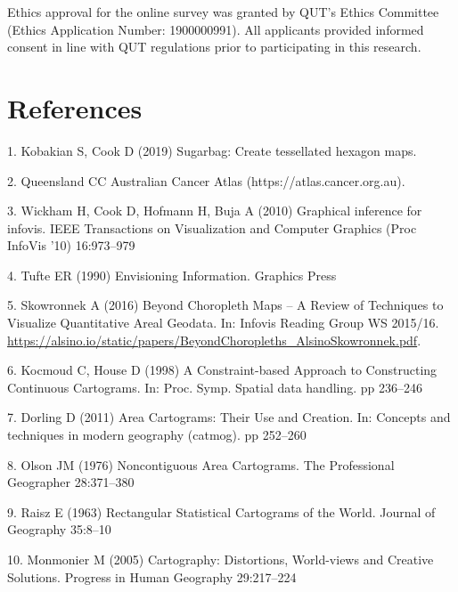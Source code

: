 \documentclass[conference,final,]{IEEEtran}
\begin{document}
Ethics approval for the online survey was granted by QUT's Ethics Committee (Ethics Application Number: 1900000991). All applicants provided informed consent in line with QUT regulations prior to participating in this research.

\newpage

\hypertarget{references}{%
\section*{References}\label{references}}

\hypertarget{refs}{}
\leavevmode\hypertarget{ref-sugarbag}{}%
1. Kobakian S, Cook D (2019) Sugarbag: Create tessellated hexagon maps.

\leavevmode\hypertarget{ref-atlas}{}%
2. Queensland CC Australian Cancer Atlas (https://atlas.cancer.org.au).

\leavevmode\hypertarget{ref-GIIV}{}%
3. Wickham H, Cook D, Hofmann H, Buja A (2010) Graphical inference for infovis. IEEE Transactions on Visualization and Computer Graphics (Proc InfoVis '10) 16:973--979

\leavevmode\hypertarget{ref-EI}{}%
4. Tufte ER (1990) Envisioning Information. Graphics Press

\leavevmode\hypertarget{ref-BCM}{}%
5. Skowronnek A (2016) Beyond Choropleth Maps -- A Review of Techniques to Visualize Quantitative Areal Geodata. In: Infovis Reading Group WS 2015/16. \url{https://alsino.io/static/papers/BeyondChoropleths_AlsinoSkowronnek.pdf}.

\leavevmode\hypertarget{ref-CBATCC}{}%
6. Kocmoud C, House D (1998) A Constraint-based Approach to Constructing Continuous Cartograms. In: Proc. Symp. Spatial data handling. pp 236--246

\leavevmode\hypertarget{ref-ACTUC}{}%
7. Dorling D (2011) Area Cartograms: Their Use and Creation. In: Concepts and techniques in modern geography (catmog). pp 252--260

\leavevmode\hypertarget{ref-NAC}{}%
8. Olson JM (1976) Noncontiguous Area Cartograms. The Professional Geographer 28:371--380

\leavevmode\hypertarget{ref-RSCW}{}%
9. Raisz E (1963) Rectangular Statistical Cartograms of the World. Journal of Geography 35:8--10

\leavevmode\hypertarget{ref-CDWCS}{}%
10. Monmonier M (2005) Cartography: Distortions, World-views and Creative Solutions. Progress in Human Geography 29:217--224
\end{document}
